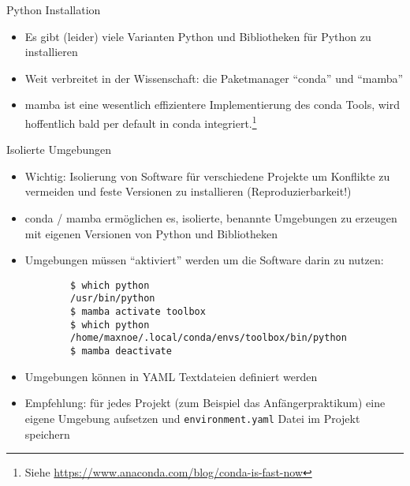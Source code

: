 \begin{frame}[fragile]{Python Installation}
  \begin{itemize}
    \item Es gibt (leider) viele Varianten Python und Bibliotheken für Python zu installieren
    \item Weit verbreitet in der Wissenschaft: die Paketmanager \enquote{conda} und \enquote{mamba}
    \item mamba ist eine wesentlich effizientere Implementierung des conda Tools, wird hoffentlich bald per default in conda integriert.\footnote{Siehe \url{https://www.anaconda.com/blog/conda-is-fast-now}}
  \end{itemize}
\end{frame}

\begin{frame}[fragile]{Isolierte Umgebungen}
  \begin{itemize}
    \item Wichtig: Isolierung von Software für verschiedene Projekte um Konflikte zu vermeiden und feste Versionen zu installieren (Reproduzierbarkeit!)
    \item conda / mamba ermöglichen es, isolierte, benannte Umgebungen zu erzeugen mit eigenen Versionen von Python und Bibliotheken
    \item Umgebungen müssen \enquote{aktiviert} werden um die Software darin zu nutzen:
      \begin{verbatim}
        $ which python
        /usr/bin/python
        $ mamba activate toolbox
        $ which python
        /home/maxnoe/.local/conda/envs/toolbox/bin/python
        $ mamba deactivate
      \end{verbatim}
    \item Umgebungen können in YAML Textdateien definiert werden
    \item Empfehlung: für jedes Projekt (zum Beispiel das Anfängerpraktikum) eine eigene Umgebung aufsetzen und \texttt{environment.yaml} Datei im Projekt speichern
  \end{itemize}
\end{frame}


